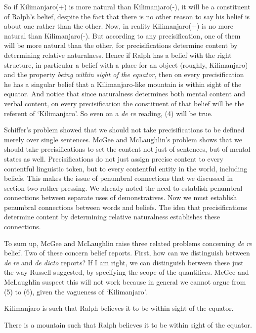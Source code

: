 \documentclass[
  10pt,
  letterpaper,
  DIV=11,
  numbers=noendperiod,
  twoside]{scrartcl}
\providecommand{\tightlist}{%
  \setlength{\itemsep}{0pt}\setlength{\parskip}{0pt}}\usepackage{longtable,booktabs,array}
\begin{document}
So if Kilimanjaro(+) is more natural than Kilimanjaro(-), it will be a
constituent of Ralph's belief, despite the fact that there is no other
reason to say his belief is about one rather than the other. Now, in
reality Kilimanjaro(+) is no more natural than Kilimanjaro(-). But
according to any precisification, one of them will be more natural than
the other, for precisifications determine content by determining
relative naturalness. Hence if Ralph has a belief with the right
structure, in particular a belief with a place for an object (roughly,
Kilimanjaro) and the property \emph{being within sight of the equator},
then on every precisification he has a singular belief that a
Kilimanjaro-like mountain is within sight of the equator. And notice
that since naturalness determines both mental content and verbal
content, on every precisification the constituent of that belief will be
the referent of `Kilimanjaro'. So even on a \emph{de re} reading, (4)
will be true.

Schiffer's problem showed that we should not take precisifications to be
defined merely over single sentences. McGee and McLaughlin's problem
shows that we should take precisifications to set the content not just
of sentences, but of mental states as well. Precisifications do not just
assign precise content to every contentful linguistic token, but to
every contentful entity in the world, including beliefs. This makes the
issue of penumbral connections that we discussed in section two rather
pressing. We already noted the need to establish penumbral connections
between separate uses of demonstratives. Now we must establish penumbral
connections between words and beliefs. The idea that precisifications
determine content by determining relative naturalness establishes these
connections.

To sum up, McGee and McLaughlin raise three related problems concerning
\emph{de re} belief. Two of these concern belief reports. First, how can
we distinguish between \emph{de re} and \emph{de dicto} reports? If I am
right, we can distinguish between these just the way Russell suggested,
by specifying the scope of the quantifiers. McGee and McLaughlin suspect
this will not work because in general we cannot argue from (5) to (6),
given the vagueness of `Kilimanjaro'.

\begin{description}
\tightlist
\item[(5)]
Kilimanjaro is such that Ralph believes it to be within sight of the
equator.
\item[(6)]
There is a mountain such that Ralph believes it to be within sight of
the equator.
\end{description}
\end{document}
